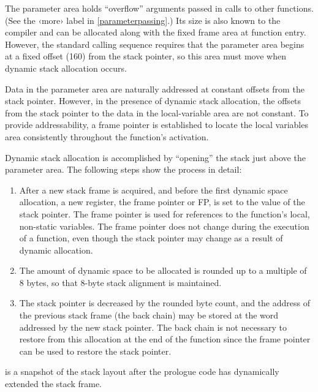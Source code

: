 \documentclass[USenglish,fontsize=11pt,twoside,%
  toc=bib,toc=idx,toc=graduated,numbers=noendperiod,
  bookmarks=true,
  bookmarksnumbered=true,
  bookmarksopen=true,
  bookmarksopenlevel=1,
  breaklinks=true,
  colorlinks=true,
  linkcolor=black,
  pdfpagelayout={TwoPageRight},
  pdfusetitle=true
]{scrreprt}
\newcommand{\jumplabel}[1]{\textsf{‹#1›}}
\newcommand{\STACKSIZE}{160}
\newcommand{\STACKSIZE}{96}
\begin{document}
The parameter area holds ``overflow'' arguments passed in calls to
other functions.  (See the \jumplabel{more} label in
\cref{parameterpassing}.)  Its size is also known to the compiler and can
be allocated along with the fixed frame area at function entry.  However,
the standard calling sequence requires that the parameter area begins
at a fixed offset (\STACKSIZE{}) from the stack pointer, so this area must
move when dynamic stack allocation occurs.

Data in the parameter area are naturally addressed at
constant offsets from the stack pointer.  However, in the presence of
dynamic stack allocation, the offsets from the stack pointer to the
data in the local-variable area are not constant.  To provide
addressability, a frame pointer is established to locate the local
variables area consistently throughout the function's
activation.

Dynamic stack allocation is accomplished by ``opening'' the stack
just above the parameter area.  The following steps show the
process in detail:

\begin{enumerate}
\item After a new stack frame is acquired, and before the
first dynamic space allocation, a new register, the frame pointer or
FP, is set to the value of the stack pointer.  The frame pointer is
used for references to the function's local, non-static variables.  The
frame pointer does not change during the execution of a function, even
though the stack pointer may change as a result of dynamic
allocation.

\item The amount of dynamic space to be allocated is rounded
up to a multiple of 8 bytes, so that 8-byte stack alignment is
maintained.

\item The stack pointer is decreased by the rounded byte
count, and the address of the previous stack frame (the back chain)
may be stored at the word addressed by the new stack pointer.  The back
chain is not necessary to restore from this allocation at the end of
the function since the frame pointer can be used to restore the stack
pointer.

\end{enumerate}

 is a snapshot of the stack layout after the
prologue code has dynamically extended the stack frame.
\end{document}
